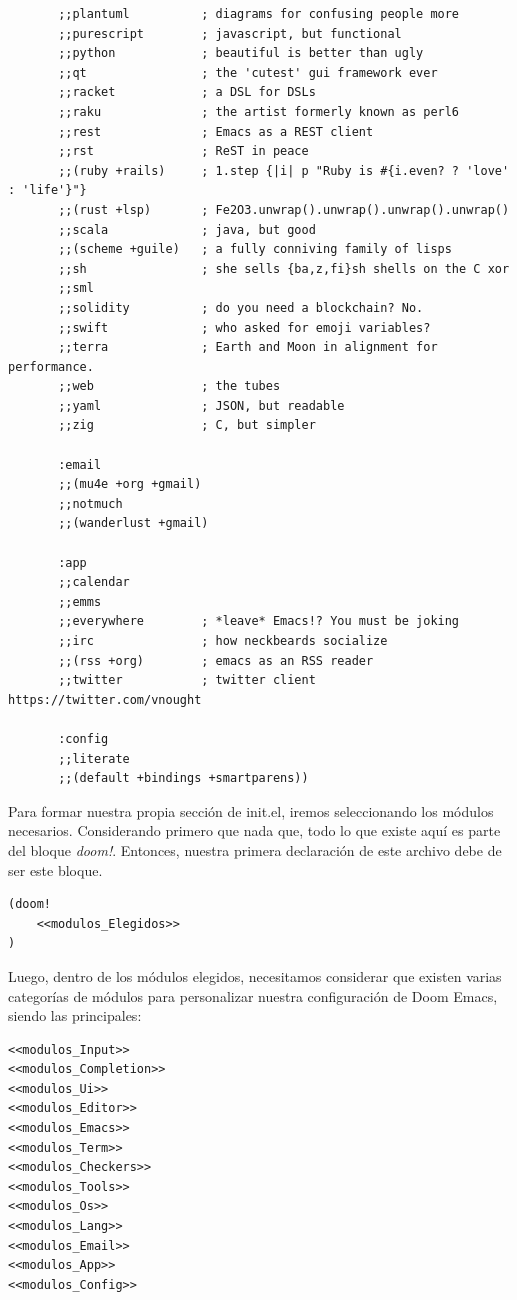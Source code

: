 \documentclass[11pt]{article}
\begin{document}
\begin{verbatim}
       ;;plantuml          ; diagrams for confusing people more
       ;;purescript        ; javascript, but functional
       ;;python            ; beautiful is better than ugly
       ;;qt                ; the 'cutest' gui framework ever
       ;;racket            ; a DSL for DSLs
       ;;raku              ; the artist formerly known as perl6
       ;;rest              ; Emacs as a REST client
       ;;rst               ; ReST in peace
       ;;(ruby +rails)     ; 1.step {|i| p "Ruby is #{i.even? ? 'love' : 'life'}"}
       ;;(rust +lsp)       ; Fe2O3.unwrap().unwrap().unwrap().unwrap()
       ;;scala             ; java, but good
       ;;(scheme +guile)   ; a fully conniving family of lisps
       ;;sh                ; she sells {ba,z,fi}sh shells on the C xor
       ;;sml
       ;;solidity          ; do you need a blockchain? No.
       ;;swift             ; who asked for emoji variables?
       ;;terra             ; Earth and Moon in alignment for performance.
       ;;web               ; the tubes
       ;;yaml              ; JSON, but readable
       ;;zig               ; C, but simpler

       :email
       ;;(mu4e +org +gmail)
       ;;notmuch
       ;;(wanderlust +gmail)

       :app
       ;;calendar
       ;;emms
       ;;everywhere        ; *leave* Emacs!? You must be joking
       ;;irc               ; how neckbeards socialize
       ;;(rss +org)        ; emacs as an RSS reader
       ;;twitter           ; twitter client https://twitter.com/vnought

       :config
       ;;literate
       ;;(default +bindings +smartparens))

\end{verbatim}

Para formar nuestra propia sección de init.el, iremos seleccionando los módulos necesarios. Considerando primero que nada que, todo lo que existe aquí es parte del bloque \emph{doom!}. Entonces, nuestra primera declaración de este archivo debe de ser este bloque.

\begin{verbatim}
(doom!
    <<modulos_Elegidos>>
)

\end{verbatim}

Luego, dentro de los módulos elegidos, necesitamos considerar que existen varias categorías de módulos para personalizar nuestra configuración de Doom Emacs, siendo las principales:

\begin{verbatim}
<<modulos_Input>>
<<modulos_Completion>>
<<modulos_Ui>>
<<modulos_Editor>>
<<modulos_Emacs>>
<<modulos_Term>>
<<modulos_Checkers>>
<<modulos_Tools>>
<<modulos_Os>>
<<modulos_Lang>>
<<modulos_Email>>
<<modulos_App>>
<<modulos_Config>>
\end{verbatim}
\end{document}
